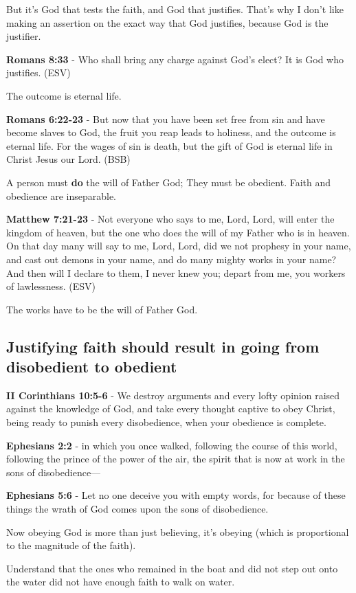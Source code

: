 \documentclass[11pt]{article}
\begin{document}
But it's God that tests the faith, and God that justifies. That's why I don't like making an assertion on the exact way that God justifies, because God is the justifier.

\textbf{Romans 8:33} -  Who shall bring any charge against God's elect?  It is God who justifies.  (ESV)

The outcome is eternal life.

\textbf{Romans 6:22-23} - But now that you have been set free from sin and have become slaves to God, the fruit you reap leads to holiness, and the outcome is eternal life. For the wages of sin is death, but the gift of God is eternal life in Christ Jesus our Lord. (BSB)

A person must \textbf{do} the will of Father God; They must be obedient.
Faith and obedience are inseparable.

\textbf{Matthew 7:21-23} -  Not everyone who says to me, Lord, Lord, will enter the kingdom of heaven, but the one who does the will of my Father who is in heaven.  On that day many will say to me, Lord, Lord, did we not prophesy in your name, and cast out demons in your name, and do many mighty works in your name?  And then will I declare to them, I never knew you; depart from me, you workers of lawlessness. (ESV)

The works have to be the will of Father God.

\subsection{Justifying faith should result in going from disobedient to obedient}
\label{sec:orgfba6f02}

\textbf{II Corinthians 10:5-6} - We destroy arguments and every lofty opinion raised against the knowledge of God, and take every thought captive to obey Christ, being ready to punish every disobedience, when your obedience is complete.

\textbf{Ephesians 2:2} - in which you once walked, following the course of this world, following the prince of the power of the air, the spirit that is now at work in the sons of disobedience—

\textbf{Ephesians 5:6} - Let no one deceive you with empty words, for because of these things the wrath of God comes upon the sons of disobedience.

Now obeying God is more than just believing, it's obeying (which is proportional to the magnitude of the faith).

Understand that the ones who remained in the boat and did not step out onto the water did not have enough faith to walk on water.
\end{document}
